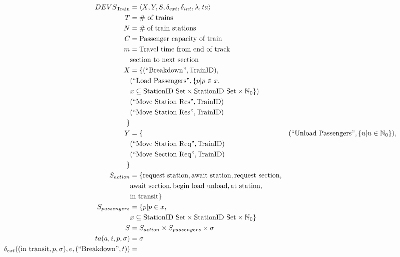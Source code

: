 \newcommand{\OutUnloadPassengers}[1]{(\text{``Unload Passengers''}, #1)}
\newcommand{\OutMoveStationReq}[1]{(\text{``Move Station Req''}, #1)}
\newcommand{\OutMoveSectionReq}[1]{(\text{``Move Section Req''}, #1)}
\newcommand{\phase}[0]{\text{phase}}

\newcommand{\Mod}[2]{\mathrm{mod} (#1, #2)}

\begin{align*}
DEVS_{\textrm{Train}} &= \left<X,Y,S,\delta_{ext},\delta_{int},\lambda,ta\right> \\
    T &= \text{\# of trains} \\
    N &= \# \text{\;of train stations} \\
    C &= \text{Passenger capacity of train} \\
    m &= \text{Travel time from end of track} \\
        & \text{section to next section} \\
    X &= \{
      \InBreakDown{\text{TrainID}}, \\
      &  \InLoadPassengers{\{ p | p \in x, \\
      & x \subseteq \text{StationID Set} \times \text{StationID Set} \times \mathbb{N}_0 \}} \\
      &  \InMoveStationRes{\text{TrainID}} \\
      &  \InMoveStationRes{\text{TrainID}} \\
    \} \\
    Y &= \{
      &  \OutUnloadPassengers{\{ u | u \in \mathbb{N}_0 \}}, \\
      &  \OutMoveStationReq{\text{TrainID}} \\
      &  \OutMoveSectionReq{\text{TrainID}} \\      
    \} \\
    S_{action} &= \{
      \text{request station}, \text{await station}, \text{request section}, \\
      &  \text{await section}, \text{begin load unload}, \text{at station}, \\
      &  \text{in transit} 
    \} \\
    S_{passengers} &= \{ p | p \in x, \\
     & x \subseteq \text{StationID Set} \times \text{StationID Set} \times \mathbb{N}_0 \} \\
    S &= S_{action} \times S_{passengers} \times \sigma \\
    ta(a, i, p, \sigma) &= \sigma \\
    \delta_{ext}((\text{in transit}, p, \sigma), e, \InBreakDown{t}) &= 

\end{align*}
